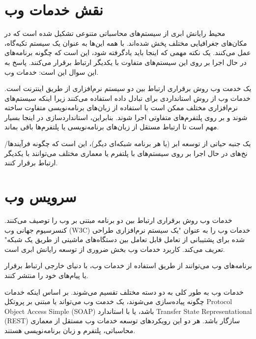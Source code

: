 \documentclass{book}
\begin{document}
        \section{نقش خدمات وب}

            محیط رایانش ابری از سیستم‌های محاسباتی متنوعی تشکیل شده است که در مکان‌های جغرافیایی مختلف پخش شده‌اند. با همه این‌ها به عنوان یک سیستم تکیه‌گاه، عمل می‌کنند. یک نکته مهمی که اینجا باید یادگرفته شود، این است که چگونه برنامه‌های در حال اجرا بر روی این سیستم‌های متفاوت با یکدیگر ارتباط برقرار می‌کنند. پاسخ به این سوال این است: خدمات وب.

            یک خدمت وب روش برقراری ارتباط بین دو سیستم نرم‌افزاری از طریق اینترنت است. خدمات وب از روش استانداردی برای تبادل داده استفاده می‌کنند زیرا اینکه سیستم‌های نرم‌افزاری مختلف ممکن است با استفاده از زبان‌های برنامه‌نویسی متفاوت ساخته شوند و بر روی پلتفرم‌های متفاوتی اجرا شوند. بنابراین، استانداردسازی در اینجا بسیار مهم است تا ارتباط مستقل از زبان‌های برنامه‌نویسی یا پلتفرم‌ها باقی بماند.

            \begin{addinfo}
                
                یک جنبه حیاتی از توسعه ابر (یا هر برنامه شبکه‌ای دیگر)، این است که چگونه فرآیندها/نخ‌های در حال اجرا بر روی سیستم‌های با پلتفرم یا معماری مختلف می‌توانند با یکدیگر ارتباط برقرار کنند.

            \end{addinfo}
        
        \section{سرویس وب}

            خدمات وب روش برقراری ارتباط بین دو برنامه مبتنی بر وب را توصیف می‌کنند. کنسرسیوم جهانی وب (W3C) خدمات وب را به عنوان "یک سیستم نرم‌افزاری طراحی شده برای پشتیبانی از تعامل قابل تعامل بین دستگاه‌های ماشینی از طریق یک شبکه" تعریف می‌کند. کاربرد خدمات وب بخش ضروری از توسعه رایانش ابری است.

            \begin{addinfo}
                
                برنامه‌های وب می‌توانند از طریق استفاده از خدمات وب، با دنیای خارجی ارتباط برقرار یا پیام‌های خود را منتشر کنند.

            \end{addinfo}

            خدمات وب به طور کلی به دو دسته مختلف تقسیم می‌شوند. بر اساس اینکه خدمات چگونه پیاده‌سازی می‌شوند، یک خدمت وب می‌تواند یا مبتنی بر پروتکل Protocol Object Access Simple (SOAP) باشد، یا با استاندارد Transfer State Representational (REST) سازگار باشد. هر دو این رویکردهای توسعه خدمات وب مستقل از معماری محاسباتی، پلتفرم و زبان برنامه‌نویسی هستند.
\end{document}
